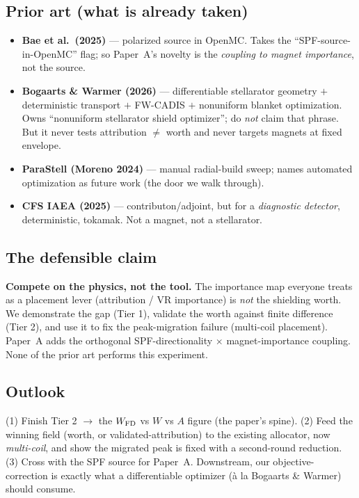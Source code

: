 \documentclass[11pt]{article}
\begin{document}
\subsection{Prior art (what is already taken)}
\begin{itemize}
\item \textbf{Bae et al.\ (2025)} --- polarized source in OpenMC. Takes the ``SPF-source-in-OpenMC''
  flag; so Paper~A's novelty is the \emph{coupling to magnet importance}, not the source.
\item \textbf{Bogaarts \& Warmer (2026)} --- differentiable stellarator geometry $+$ deterministic
  transport $+$ FW-CADIS $+$ nonuniform blanket optimization. Owns ``nonuniform stellarator shield
  optimizer''; do \emph{not} claim that phrase. But it never tests attribution $\neq$ worth and
  never targets magnets at fixed envelope.
\item \textbf{ParaStell (Moreno 2024)} --- manual radial-build sweep; names automated optimization
  as future work (the door we walk through).
\item \textbf{CFS IAEA (2025)} --- contributon/adjoint, but for a \emph{diagnostic detector},
  deterministic, tokamak. Not a magnet, not a stellarator.
\end{itemize}

\subsection{The defensible claim}
\begin{key}
\textbf{Compete on the physics, not the tool.} The importance map everyone treats as a placement
lever (attribution / VR importance) is \emph{not} the shielding worth. We demonstrate the gap
(Tier 1), validate the worth against finite difference (Tier 2), and use it to fix the
peak-migration failure (multi-coil placement). Paper~A adds the orthogonal SPF-directionality
$\times$ magnet-importance coupling. None of the prior art performs this experiment.
\end{key}

\subsection{Outlook}
(1) Finish Tier 2 $\to$ the $W_{\rm FD}$ vs $W$ vs $A$ figure (the paper's spine). (2) Feed the
winning field (worth, or validated-attribution) to the existing allocator, now \emph{multi-coil},
and show the migrated peak is fixed with a second-round reduction. (3) Cross with the SPF source
for Paper~A. Downstream, our objective-correction is exactly what a differentiable optimizer (\`a
la Bogaarts \& Warmer) should consume.
\end{document}

